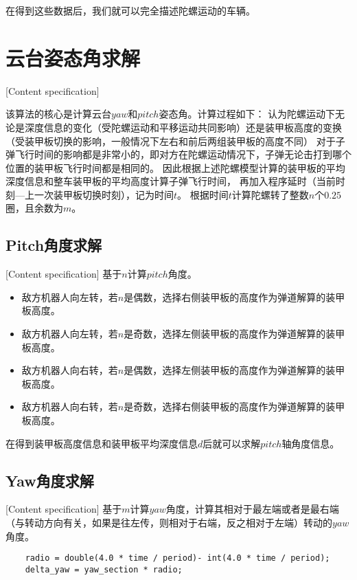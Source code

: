 在得到这些数据后，我们就可以完全描述陀螺运动的车辆。


\section{云台姿态角求解}[Content specification]


该算法的核心是计算云台$yaw$和$pitch$姿态角。计算过程如下：
认为陀螺运动下无论是深度信息的变化（受陀螺运动和平移运动共同影响）还是装甲板高度的变换（受装甲板切换的影响，一般情况下左右和前后两组装甲板的高度不同）
对于子弹飞行时间的影响都是非常小的，即对方在陀螺运动情况下，子弹无论击打到哪个位置的装甲板飞行时间都是相同的。
因此根据上述陀螺模型计算的装甲板的平均深度信息和整车装甲板的平均高度计算子弹飞行时间，
再加入程序延时（当前时刻—上一次装甲板切换时刻），记为时间$t$。
根据时间$t$计算陀螺转了整数$n$个$0.25$圈，且余数为$m$。




\subsection{Pitch角度求解}[Content specification]
基于$n$计算$pitch$角度。
\begin{itemize}[itemindent=2em]
    \item 敌方机器人向左转，若$n$是偶数，选择右侧装甲板的高度作为弹道解算的装甲板高度。
    \item 敌方机器人向左转，若$n$是奇数，选择左侧装甲板的高度作为弹道解算的装甲板高度。
    \item 敌方机器人向右转，若$n$是偶数，选择左侧装甲板的高度作为弹道解算的装甲板高度。
    \item 敌方机器人向右转，若$n$是奇数，选择右侧装甲板的高度作为弹道解算的装甲板高度。
\end{itemize}

在得到装甲板高度信息和装甲板平均深度信息$d$后就可以求解$pitch$轴角度信息。

\subsection{Yaw角度求解}[Content specification]
基于$m$计算$yaw$角度，计算其相对于最左端或者是最右端（与转动方向有关，如果是往左传，则相对于右端，反之相对于左端）转动的$yaw$角度。
\begin{lstlisting}
    radio = double(4.0 * time / period)- int(4.0 * time / period);
    delta_yaw = yaw_section * radio;
\end{lstlisting}

